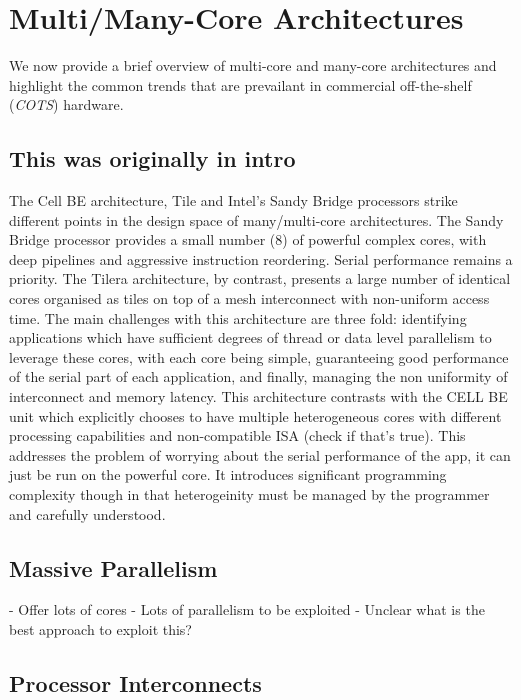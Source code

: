 \section{Multi/Many-Core Architectures}
\label{sec:overview}

We now provide a brief overview of multi-core and many-core architectures and
highlight the common trends that are prevailant in commercial off-the-shelf
(\emph{COTS}) hardware.

\subsection{This was originally in intro}
The Cell BE architecture, Tile and Intel's Sandy Bridge processors
strike different points in the design space of many/multi-core architectures.
The Sandy Bridge processor provides a small number (8) of powerful complex cores,
with deep pipelines and aggressive instruction reordering. Serial performance
remains a priority. The Tilera architecture, by contrast, presents a large number
of identical cores organised as tiles on top of a mesh interconnect with non-uniform
access time. The main challenges with this architecture are three fold:
identifying applications which have sufficient degrees of thread or data level
parallelism to leverage these cores, with each core being simple, guaranteeing
good performance of the serial part of each application, and finally, managing the 
non uniformity of interconnect and memory latency. This architecture
contrasts with the CELL BE unit which explicitly chooses to have multiple
heterogeneous cores with different processing capabilities and non-compatible ISA
(check if that's true). This addresses the problem of worrying about the serial
performance of the app, it can just be run on the powerful core. It introduces
significant programming complexity though in that heterogeinity must be managed
by the programmer and carefully understood.

\subsection{Massive Parallelism}

- Offer lots of cores
- Lots of parallelism to be exploited
- Unclear what is the best approach to exploit this?

\subsection{Processor Interconnects}

